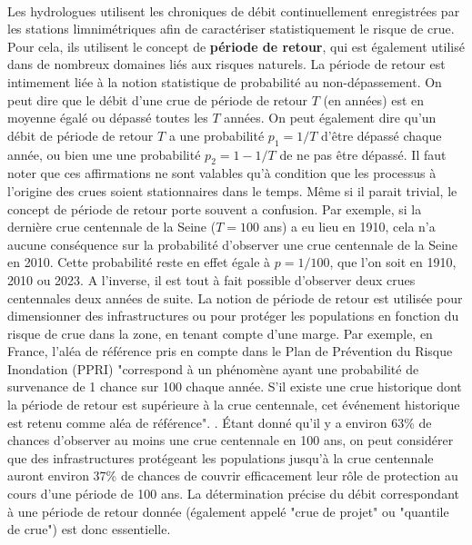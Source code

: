 \documentclass[11pt]{article}
\begin{document}
	\paragraph{} Les hydrologues utilisent les chroniques de débit continuellement enregistrées par les stations limnimétriques afin de caractériser statistiquement le risque de crue. Pour cela, ils utilisent le concept de \textbf{période de retour}, qui est également utilisé dans de nombreux domaines liés aux risques naturels. La période de retour est intimement liée à la notion statistique de probabilité au non-dépassement. On peut dire que le débit d'une crue de période de retour $T$ (en années) est en moyenne égalé ou dépassé toutes les $T$ années. On peut également dire qu'un débit de période de retour $T$ a une probabilité $p_1 = 1/T$ d'être dépassé chaque année, ou bien une une probabilité $p_2 = 1-1/T$ de ne pas être dépassé. Il faut noter que ces affirmations ne sont valables qu'à condition que les processus à l'origine des crues soient stationnaires dans le temps. Même si il parait trivial, le concept de période de retour porte souvent a confusion. Par exemple, si la dernière crue centennale de la Seine ($T = 100$ ans) a eu lieu en 1910, cela n'a aucune conséquence sur la probabilité d'observer une crue centennale de la Seine en 2010. Cette probabilité reste en effet égale à $p = 1/100$, que l'on soit en 1910, 2010 ou 2023. A l'inverse, il est tout à fait possible d'observer deux crues centennales deux années de suite. La notion de période de retour est utilisée pour dimensionner des infrastructures ou pour protéger les populations en fonction du risque de crue dans la zone, en tenant compte d'une marge. Par exemple, en France, l'aléa de référence pris en compte dans le Plan de Prévention du Risque Inondation (PPRI) "correspond à un phénomène ayant une probabilité de survenance de 1 chance sur 100 chaque année. S'il existe une crue historique dont la période de retour est supérieure à la crue centennale, cet événement historique est retenu comme aléa de référence". \citep{medd_site_nodate}. Étant donné qu'il y a environ 63\% de chances d'observer au moins une crue centennale en 100 ans, on peut considérer que des infrastructures protégeant les populations jusqu'à la crue centennale auront environ 37\% de chances de couvrir efficacement leur rôle de protection au cours d'une période de 100 ans. La détermination précise du débit correspondant à une période de retour donnée (également appelé "crue de projet" ou "quantile de crue") est donc essentielle.
	
\end{document}
